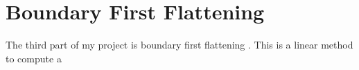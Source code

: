 \section{Boundary First Flattening}
The third part of my project is boundary first flattening \cite{1704.06873}. This is a linear method to compute a 